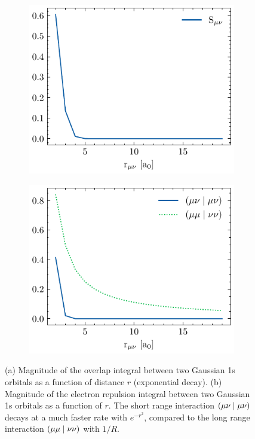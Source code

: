 \begin{figure}
\centering
\begin{subfigure}{0.45\linewidth}
\includegraphics[scale=0.8]{Pics/overlap_decay}
\caption{}
\end{subfigure}
\begin{subfigure}{0.45\linewidth}
\includegraphics[scale=0.8]{Pics/eri_decay}
\caption{}
\end{subfigure}%
\caption[Decay of the overlap and electron repulsion integrals]{(a) Magnitude of the overlap integral between two Gaussian 1s orbitals as a function of distance $r$ (exponential decay). (b) Magnitude of the electron repulsion integral between two Gaussian 1s orbitals as a function of $r$. The short range interaction $\left( \mu\nu \mid \mu\nu \right)$ decays at a  much faster rate with $e^{-r^2}$, compared to the long range interaction $\left( \mu\mu \mid \nu\nu \right)$ with $1/R$.}
\label{fig:HCHAIN_DECAY}
\end{figure}

